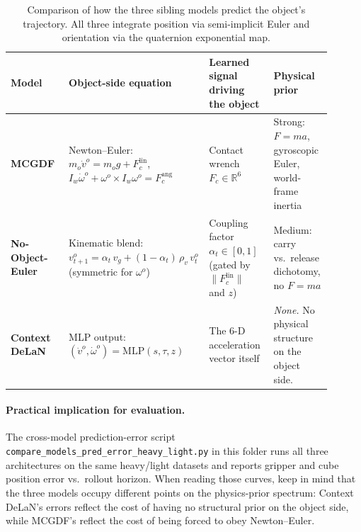 \documentclass[11pt]{article}
\begin{document}
\begin{table}[h]
\centering
\small
\begin{tabular}{p{0.18\linewidth} p{0.34\linewidth} p{0.20\linewidth} p{0.18\linewidth}}
\toprule
Model & Object-side equation & Learned signal driving the object & Physical prior \\
\midrule
\textbf{MCGDF} & Newton--Euler:
\(m_o\dot v^o = m_o g + F_c^{\mathrm{lin}}\),
\(I_w\dot\omega^o + \omega^o\!\times\! I_w\omega^o = F_c^{\mathrm{ang}}\)
& Contact wrench $F_c \in \mathbb{R}^6$
& Strong: $F=ma$, gyroscopic Euler, world-frame inertia \\
\textbf{No-Object-Euler} & Kinematic blend:
\(v^o_{t+1} = \alpha_t\, v_g + (1-\alpha_t)\,\rho_v\, v^o_t\)
(symmetric for $\omega^o$)
& Coupling factor $\alpha_t \in [0,1]$ (gated by $\|F_c^{\mathrm{lin}}\|$ and $z$)
& Medium: carry vs.\ release dichotomy, no $F=ma$ \\
\textbf{Context DeLaN} & MLP output:
\((\dot v^o, \dot\omega^o) = \mathrm{MLP}(s,\tau,z)\)
& The 6-D acceleration vector itself
& \emph{None.}  No physical structure on the object side. \\
\bottomrule
\end{tabular}
\caption{Comparison of how the three sibling models predict the
object's trajectory.  All three integrate position via semi-implicit
Euler and orientation via the quaternion exponential map.}
\label{tab:cd-vs-others}
\end{table}

\paragraph{Practical implication for evaluation.}
The cross-model prediction-error script
\texttt{compare\_models\_pred\_error\_heavy\_light.py} in this folder
runs all three architectures on the same heavy/light datasets and
reports gripper and cube position error vs.\ rollout horizon.  When
reading those curves, keep in mind that the three models occupy
different points on the physics-prior spectrum: Context DeLaN's
errors reflect the cost of having no structural prior on the object
side, while MCGDF's reflect the cost of being forced to obey
Newton--Euler.
\end{document}
